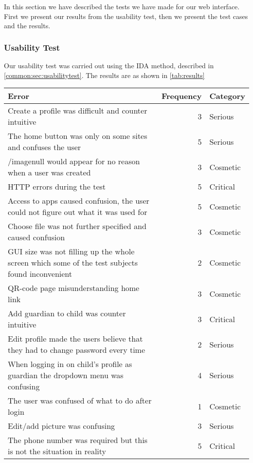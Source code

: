 In this section we have described the tests we have made for our web interface. First we present our results from the usability test, then we present the test cases and the results.

\subsubsection{Usability Test}

Our usability test was carried out using the IDA method, described in \autoref{common:sec:usabilitytest}. The results are as shown in \autoref{tab:results}

\begin{table}[H]
	\scriptsize
	\centering
	\begin{tabular}{|p{7cm}|r|l|}
		\hline
		Error & Frequency & Category \\
		\hline
		\hline
		Create a profile was difficult and counter intuitive & 3 & Serious \\ \hline
		The home button was only on some sites and confuses the user & 5 & Serious \\ \hline
		/imagenull would appear for no reason when a user was created & 3 & Cosmetic \\ \hline
		HTTP errors during the test & 5 & Critical \\ \hline
		Access to apps caused confusion, the user could not figure out what it was used for & 5 & Cosmetic \\ \hline
		Choose file was not further specified and caused confusion & 3 & Cosmetic \\ \hline
		GUI size was not filling up the whole screen which some of the test subjects found inconvenient & 2 & Cosmetic \\ \hline
		QR-code page misunderstanding home link & 3 & Cosmetic \\ \hline
		Add guardian to child was counter intuitive & 3 & Critical \\ \hline
		Edit profile made the users believe that they had to change password every time & 2 & Serious \\ \hline
		When logging in on child's profile as guardian the dropdown menu was confusing & 4 & Serious \\ \hline
		The user was confused of what to do after login & 1 & Cosmetic \\ \hline
		Edit/add picture was confusing & 3 & Serious \\ \hline
		The phone number was required but this is not the situation in reality & 5 & Critical \\ \hline

\end{tabular}
\end{table}
